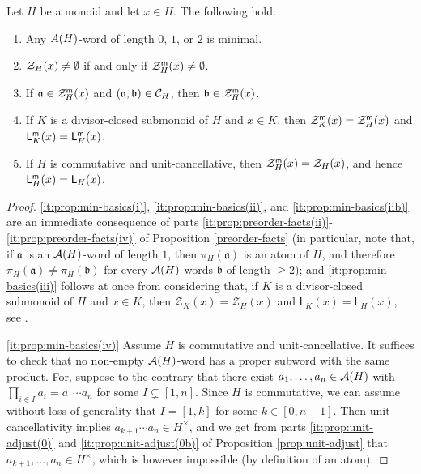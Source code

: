 \begin{prop}\label{prop:min-basics}
	Let $H$ be a monoid and let $x\in H$. The following hold:
	\begin{enumerate}[label = {\rm (\roman{*})}]
		\item\label{it:prop:min-basics(i)} Any $\\A(H)$-word of length $0$, $1$, or $2$ is minimal.
		\item\label{it:prop:min-basics(ii)} $\mathcal{Z}_H(x) \ne \emptyset$ if and only if  $\mathcal{Z}_H^{\mathsf{m}}(x) \ne \emptyset$.
		\item\label{it:prop:min-basics(iib)} If $\mathfrak a \in \mathcal Z_H^{\mathsf{m}}(x)$ and $(\mathfrak a, \mathfrak b) \in \mathcal{C}_H$, then $\mathfrak b \in \mathcal Z_H^{\mathsf{m}}(x)$.
		\item\label{it:prop:min-basics(iii)} If $K$ is a divisor-closed submonoid of $H$ and $x \in K$, then $\mathcal{Z}_K^{\mathsf{m}}(x) = \mathcal{Z}_H^{\mathsf{m}}(x)$ and $\mathsf L_K^{\mathsf{m}}(x) = \mathsf L_H^{\mathsf{m}}(x)$.
		\item\label{it:prop:min-basics(iv)} If $H$ is commutative and unit-cancellative, then $\mathcal{Z}_H^{\mathsf{m}}(x) = \mathcal{Z}_H(x)$, and hence $\mathsf L_H^{\mathsf{m}}(x) = \mathsf L_H(x)$.
	\end{enumerate}
\end{prop}
%
\begin{proof}
	\ref{it:prop:min-basics(i)}, \ref{it:prop:min-basics(ii)}, and \ref{it:prop:min-basics(iib)} are an immediate consequence of parts \ref{it:prop:preorder-facts(ii)}-\ref{it:prop:preorder-facts(iv)} of Proposition \ref{preorder-facts} (in particular, note that, if $\mathfrak a$  is an $\mathcal{A}(H)$-word of length $1$, then $\pi_H(\mathfrak a)$ is an atom of $H$, and therefore $\pi_H(\mathfrak a) \ne \pi_H(\mathfrak b)$ for every  $\mathcal{A}(H)$-words $\mathfrak b$ of length $\ge 2$); and \ref{it:prop:min-basics(iii)} follows at once from considering that, if $K$ is a divisor-closed submonoid of $H$ and $x \in K$, then $\mathcal Z_K(x) = \mathcal Z_H(x)$ and $\mathsf L_K(x) = \mathsf L_H(x)$, see \cite[Proposition 2.21(ii)]{fan-tringali18}.
	
	\ref{it:prop:min-basics(iv)} Assume $H$ is commutative and unit-cancellative. It suffices to check that no non-empty $\mathcal{A}(H)$-word has a proper subword with the same product.
	For, suppose to the contrary that there exist  $a_1,\dots,a_n \in \mathcal{A}(H)$ with $\prod_{i \in I} a_i = a_1\cdots a_n$ for some $I \subsetneq [ 1, n ]$. Since $H$ is commutative, we can assume without loss of generality that $I = [ 1, k ]$ for some $k \in [ 0, n-1 ]$. Then unit-cancellativity implies $a_{k+1}\cdots a_n \in H^\times$, and we get from parts \ref{it:prop:unit-adjust(0)} and \ref{it:prop:unit-adjust(0b)} of Proposition \ref{prop:unit-adjust} that $a_{k+1},\dots,a_n \in H^\times$, which is however impossible (by definition of an atom).	
%	
\end{proof}
